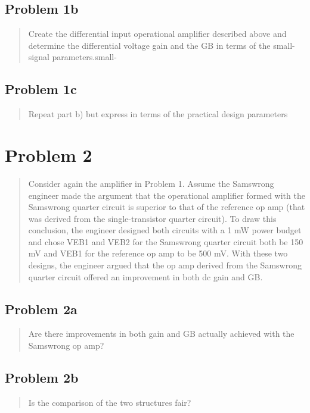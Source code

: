 \documentclass[10pt,a4paper]{article}
\let\oldsubsection\subsection
\renewcommand{\subsection}{%
    \setcounter{equation}{0}%
    \oldsubsection%
}
\begin{document}
\subsection{Problem 1b}
\begin{quote}

Create the differential input operational amplifier described above and determine the differential voltage gain and the GB in terms of the small-signal parameters.small-
\end{quote}





\subsection{Problem 1c}
\begin{quote}

Repeat part b) but express in terms of the practical design parameters
\end{quote}



\section{Problem 2}
\begin{quote}
Consider again the amplifier in Problem 1. Assume the Samswrong
engineer made the argument that the operational amplifier formed with the Samswrong
quarter circuit is superior to that of the reference op amp (that was derived from the
single-transistor quarter circuit). To draw this conclusion, the engineer designed both
circuits with a 1 mW power budget and chose VEB1 and VEB2 for the Samswrong quarter
circuit both be 150 mV and VEB1 for the reference op amp to be 500 mV. With these
two designs, the engineer argued that the op amp derived from the Samswrong quarter
circuit offered an improvement in both dc gain and GB.
\end{quote}

\subsection{Problem 2a}
\begin{quote}
Are there improvements in both gain and GB actually achieved with the
Samswrong op amp?\\
\end{quote}


\subsection{Problem 2b}
\begin{quote}
Is the comparison of the two structures fair?\\
\end{quote}
\end{document}
